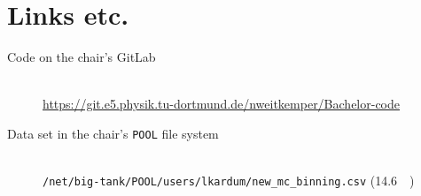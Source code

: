 \clearpage
\section{Links etc.}
\begin{description}
  \item[Code on the chair's GitLab] \hfill \\
    \url{https://git.e5.physik.tu-dortmund.de/nweitkemper/Bachelor-code}
  \item[Data set in the chair's \texttt{POOL} file system] \hfill \\
    \texttt{/net/big-tank/POOL/users/lkardum/new\_mc\_binning.csv} (\SI{14.6}{\giga\byte})
\end{description}
